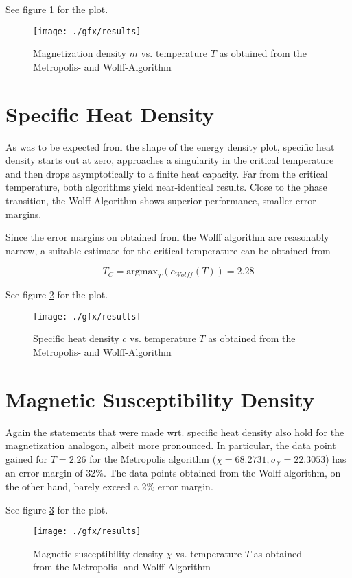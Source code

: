 See figure \ref{fig:evsM} for the plot.

\begin{figure}
	\texttt{[image: ./gfx/results]}
	\caption%
{Magnetization density $m$ vs. temperature $T$ as obtained from the Metropolis- and Wolff-Algorithm}
\label{fig:evsM}
\end{figure}

\section{Specific Heat Density}
As was to be expected from the shape of the energy density plot, specific heat density starts out at zero, approaches a singularity in the critical temperature and then drops asymptotically to a finite heat capacity. Far from the critical temperature, both algorithms yield near-identical results. Close to the phase transition, the Wolff-Algorithm shows superior performance, \ie smaller error margins.

Since the error margins on obtained from the Wolff algorithm are reasonably narrow, a suitable estimate for the critical temperature can be obtained from

\[ T_C = \text{argmax}_T (c_{Wolff}(T)) = 2.28 \]

See figure \ref{fig:evsC} for the plot.

\begin{figure}
	\texttt{[image: ./gfx/results]}
	\caption%
{Specific heat density $c$ vs. temperature $T$ as obtained from the Metropolis- and Wolff-Algorithm}
\label{fig:evsC}
\end{figure}

\section{Magnetic Susceptibility Density}
Again the statements that were made wrt. specific heat density also hold for the magnetization analogon, albeit more pronounced. In particular, the data point gained for $T=2.26$ for the Metropolis algorithm ($\chi = 68.2731, \sigma_\chi = 22.3053$) has an error margin of 32\%. The data points obtained from the Wolff algorithm, on the other hand, barely exceed a 2\% error margin.

See figure \ref{fig:evsX} for the plot.

\begin{figure}
	\texttt{[image: ./gfx/results]}
	\caption%
{Magnetic susceptibility density $\chi$ vs. temperature $T$ as obtained from the Metropolis- and Wolff-Algorithm}
\label{fig:evsX}
\end{figure}

